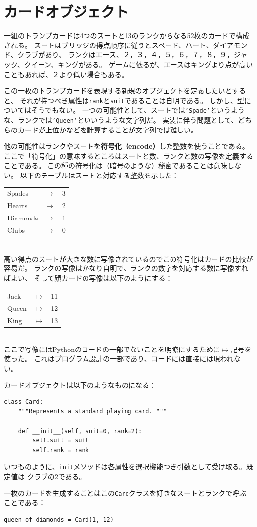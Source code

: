 \documentclass[a4j,12pt,makeidx]{jbook}
\begin{document}
\section{カードオブジェクト}
一組のトランプカードは4つのスートと13のランクからなる52枚のカードで構成される。
スートはブリッジの得点順序に従うとスペード、ハート、ダイアモンド、クラブがあり、
ランクはエース、２，３，４，５，６，７，８，９，ジャック、クイーン、キングがある。
ゲームに依るが、エースはキングより点が高いこともあれば、２より低い場合もある。\par
この一枚のトランプカードを表現する新規のオブジェクトを定義したいとすると、
それが持つべき属性は{\tt rank}と{\tt suit}であることは自明である。
しかし、型についてはそうでもない。
一つの可能性として、スートでは{\tt 'Spade'}というような、ランクでは{\tt 'Queen'}といいうような文字列だ。
実装に伴う問題として、どちらのカードが上位かなどを計算することが文字列では難しい。\par
他の可能性はランクやスートを{\bf 符号化（encode）}した整数を使うことである。
ここで「符号化」の意味するところはスートと数、ランクと数の写像を定義することである。
この種の符号化は（暗号のような）秘密であることは意味しない。
以下のテーブルはスートと対応する整数を示した：\\
%
\newcommand{\mymapsto}{$\mapsto$}
%
\begin{tabular}{l c l}
Spades & \mymapsto & 3 \\
Hearts & \mymapsto & 2 \\
Diamonds & \mymapsto & 1 \\
Clubs & \mymapsto & 0
\end{tabular} \\
%    
高い得点のスートが大きな数に写像されているのでこの符号化はカードの比較が容易だ。
ランクの写像はかなり自明で、ランクの数字を対応する数に写像すればよい、
そして顔カードの写像は以下のようにする：\\
%
\begin{tabular}{l c l}
Jack & \mymapsto & 11 \\
Queen & \mymapsto & 12 \\
King & \mymapsto & 13 \\
\end{tabular} \\
%
ここで写像にはPythonのコードの一部でないことを明瞭にするために{\mymapsto}記号を使った。
これはプログラム設計の一部であり、コードには直接には現われない。\par
カードオブジェクトは以下のようなものになる：
\begin{verbatim}
class Card:
    """Represents a standard playing card. """

    def __init__(self, suit=0, rank=2):
        self.suit = suit
        self.rank = rank
\end{verbatim}
いつものように、{\tt init}メソッドは各属性を選択機能つき引数として受け取る。既定値は
クラブの2である。\par
一枚のカードを生成することはこの{\tt Card}クラスを好きなスートとランクで呼ぶことである：
\begin{verbatim}
queen_of_diamonds = Card(1, 12)
\end{verbatim}
%
\end{document}
